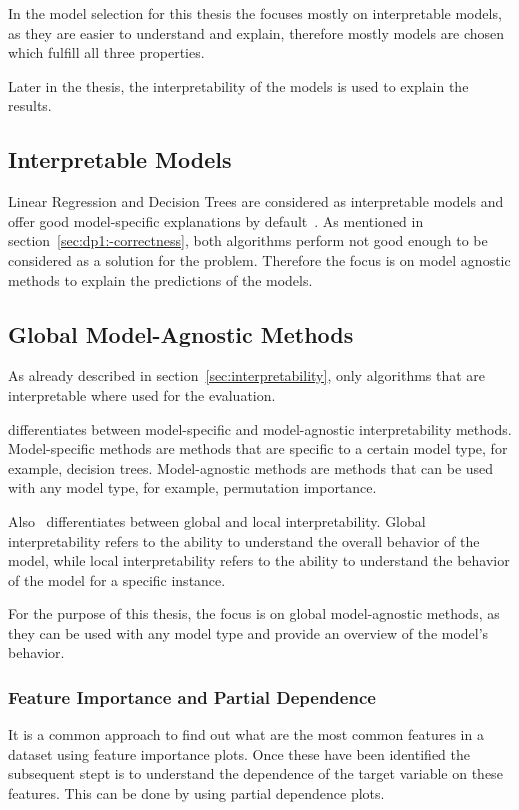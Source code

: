 In the model selection for this thesis the focuses mostly on interpretable models,
as they are easier to understand and explain, therefore mostly models are chosen which fulfill
all three properties.

Later in the thesis, the interpretability of the models is used to explain
the results.

\subsection{Interpretable Models}\label{subsec:interpretable-models}
Linear Regression and Decision Trees are considered as interpretable models and offer good
model-specific explanations by default~\cite{molnar2020interpretable}.
As mentioned in section~\ref{sec:dp1:-correctness}, both algorithms perform not good enough
to be considered as a solution for the problem.
Therefore the focus is on model agnostic methods to explain the predictions of the models.



\subsection*{Global Model-Agnostic Methods}
As already described in section~\ref{sec:interpretability}, only algorithms
that are interpretable where used for the evaluation.

\cite{molnar2020interpretable} differentiates between
model-specific and model-agnostic interpretability methods.
Model-specific methods are methods that are specific to a certain model type, for example,
decision trees.
Model-agnostic methods are methods that can be used with any model type, for
example, permutation importance.

Also~\cite{molnar2020interpretable} differentiates between global and local
interpretability. Global
interpretability refers to the ability to understand the overall behavior of
the model, while local interpretability refers to the ability to understand the behavior of the
model for a specific instance.

For the purpose of this thesis, the focus is on global model-agnostic
methods, as they can be used
with any model type and provide an overview of the model's behavior.

\subsubsection{Feature Importance and Partial Dependence}
It is a common approach to find out what are the most common features in a dataset using feature
importance plots.
Once these have been identified the subsequent stept is to understand the dependence of the
target variable on these features.
This can be done by using partial dependence plots.

